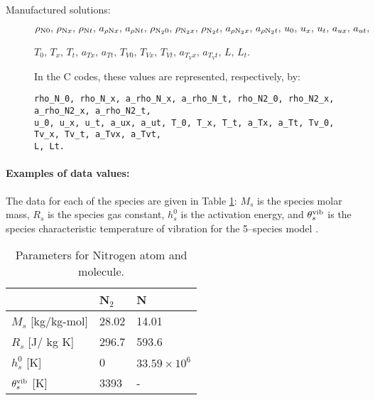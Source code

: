 \begin{description}
\begin{verbatim}
\end{verbatim}


\item[Manufactured solutions:] $\rho_{\text{N} 0} , \,  \rho_{\text{N} x} , \,  \rho_{\text{N} t} ,\,  a_{  \rho \text{N} x } , \,  a_{  \rho \text{N} t } ,\,  \rho_{\text{N}_2 0} , \, \rho_{\text{N}_2 x} , \, \rho_{\text{N}_2 t} ,\,  a_{ \rho \text{N}_2 x } , \,  a_{ \rho \text{N}_2 t } ,\,  u_{0} , \, u_{x}  , \, u_{t}  ,\, a_{u x}  , \, a_{u t}  , $

$ T_{0} , \, T_{x} , \, T_{t} ,\,  a_{T x} , \,  a_{T t} ,\,  T_{V0} , \, T_{Vx}  ,  \, T_{Vt}  ,\,  a_{T_V x} , \,  a_{T_V t} ,\, L,\, L_t $.

\vspace{10pt}
In the C codes, these values are represented, respectively, by:
\vspace{-5pt}
\begin{verbatim} 
rho_N_0, rho_N_x, a_rho_N_x, a_rho_N_t, rho_N2_0, rho_N2_x, a_rho_N2_x, a_rho_N2_t, 
u_0, u_x, u_t, a_ux, a_ut, T_0, T_x, T_t, a_Tx, a_Tt, Tv_0, Tv_x, Tv_t, a_Tvx, a_Tvt, 
L, Lt.
\end{verbatim}
\end{description}


\paragraph{Examples of data values:}
The data for each of the species are given in Table \ref{table01}: $M_s$ is the species molar mass,   $R_s$ is the species gas constant, $h^0_s$ is the activation energy, and $\theta^{\text{vib}}_{s}$ is the species characteristic temperature of vibration for the 5--species model \citep{Kessler2004}.
\begin{table}[htb]
\caption{Parameters for Nitrogen atom and molecule.}
\centering
\begin{tabular}{l l l}
\hline\hline
 &     N$_2$     &  N  \\ [0.25ex]
\hline 
$M_s$ [kg/kg-mol]  & 28.02     &14.01               \vspace{2pt} \\
$R_s$ [J/ kg K]    & 296.7    &593.6               \vspace{2pt}\\
$h^0_s$ [K]        & 0        &$33.59\times 10^6$  \vspace{2pt}\\
$\theta^{\text{vib}}_{s}$ [K] & 3393     &-                    \vspace{2pt}\\
\hline
\end{tabular}
\label{table01}
\end{table}


